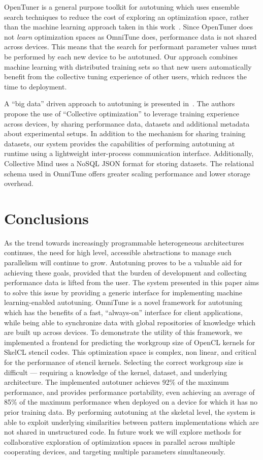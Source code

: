 \documentclass[nonatbib,preprint,nocopyrightspace,9pt]{sigplanconf}
\begin{document}
OpenTuner is a general purpose toolkit for autotuning which uses ensemble search
techniques to reduce the cost of exploring an optimization space, rather than
the machine learning approach taken in this work~\cite{Ansel2013}. Since
OpenTuner does not \emph{learn} optimization spaces as OmniTune does,
performance data is not shared across devices. This means that the search for
performant parameter values must be performed by each new device to be
autotuned. Our approach combines machine learning with distributed training sets
so that new users automatically benefit from the collective tuning experience of
other users, which reduces the time to deployment.

A ``big data'' driven approach to autotuning is presented in~\cite{Fursin2014}.
The authors propose the use of ``Collective optimization'' to leverage training
experience across devices, by sharing performance data, datasets and additional
metadata about experimental setups. In addition to the mechanism for sharing
training datasets, our system provides the capabilities of performing autotuning
at runtime using a lightweight inter-process communication interface.
Additionally, Collective Mind uses a NoSQL JSON format for storing datasets. The
relational schema used in OmniTune offers greater scaling performance and lower
storage overhead.


\section{Conclusions}\label{sec:conclusions}

As the trend towards increasingly programmable heterogeneous architectures
continues, the need for high level, accessible abstractions to manage such
parallelism will continue to grow. Autotuning proves to be a valuable aid for
achieving these goals, provided that the burden of development and collecting
performance data is lifted from the user. The system presented in this paper
aims to solve this issue by providing a generic interface for implementing
machine learning-enabled autotuning. OmniTune is a novel framework for
autotuning which has the benefits of a fast, ``always-on'' interface for client
applications, while being able to synchronize data with global repositories of
knowledge which are built up across devices. To demonstrate the utility of this
framework, we implemented a frontend for predicting the workgroup size of OpenCL
kernels for SkelCL stencil codes. This optimization space is complex, non
linear, and critical for the performance of stencil kernels. Selecting the
correct workgroup size is difficult --- requiring a knowledge of the kernel,
dataset, and underlying architecture. The implemented autotuner achieves 92\% of
the maximum performance, and provides performance portability, even achieving an
average of 85\% of the maximum performance when deployed on a device for which
it has no prior training data. By performing autotuning at the skeletal level,
the system is able to exploit underlying similarities between pattern
implementations which are not shared in unstructured code. In future work we
will explore methods for collaborative exploration of optimization spaces in
parallel across multiple cooperating devices, and targeting multiple parameters
simultaneously.
\end{document}
